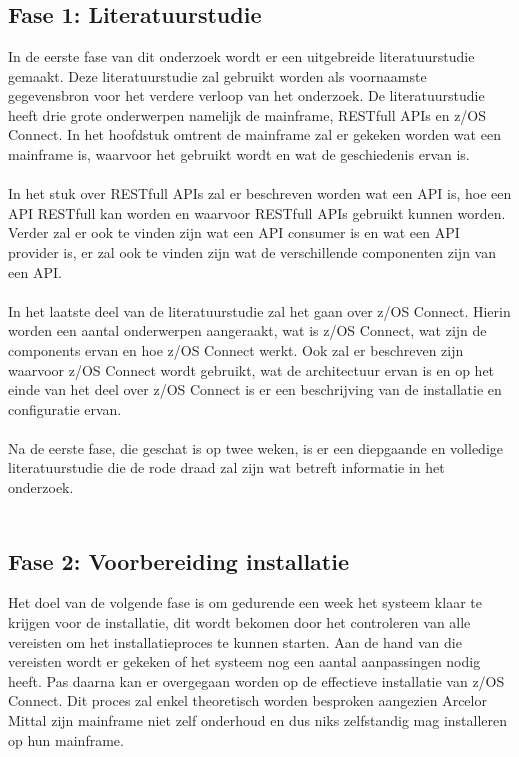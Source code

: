 
\chapter{}%
\label{ch:methodologie}
\section{Fase 1: Literatuurstudie}
\label{sec:Fase 1: Literatuurstudie}
In de eerste fase van dit onderzoek wordt er een uitgebreide literatuurstudie gemaakt. Deze literatuurstudie zal gebruikt worden als voornaamste gegevensbron voor het verdere verloop van het onderzoek. De literatuurstudie heeft drie grote onderwerpen namelijk de mainframe, RESTfull APIs en z/OS Connect. In het hoofdstuk omtrent de mainframe zal er gekeken worden wat een mainframe is, waarvoor het gebruikt wordt en wat de geschiedenis ervan is.
\\ \\
In het stuk over RESTfull APIs zal er beschreven worden wat een API is, hoe een API RESTfull kan worden en waarvoor RESTfull APIs gebruikt kunnen worden. Verder zal er ook te vinden zijn wat een API consumer is en wat een API provider is, er zal ook te vinden zijn wat de verschillende componenten zijn van een API.
\\ \\
In het laatste deel van de literatuurstudie zal het gaan over z/OS Connect. Hierin worden een aantal onderwerpen aangeraakt, wat is z/OS Connect, wat zijn de components ervan en hoe z/OS Connect werkt. Ook zal er beschreven zijn waarvoor z/OS Connect wordt gebruikt, wat de architectuur ervan is en op het einde van het deel over z/OS Connect is er een beschrijving van de installatie en configuratie ervan.
\\ \\
Na de eerste fase, die geschat is op twee weken, is er een diepgaande en volledige literatuurstudie die de rode draad zal zijn wat betreft informatie in het onderzoek.
\\ \\
\section{Fase 2: Voorbereiding installatie}
\label{sec:Fase 2: Voorbereiding installatie}
Het doel van de volgende fase is om gedurende een week het systeem klaar te krijgen voor de installatie, dit wordt bekomen door het controleren van alle vereisten om het installatieproces te kunnen starten. Aan de hand van die vereisten wordt er gekeken of het systeem nog een aantal aanpassingen nodig heeft. Pas daarna kan er overgegaan worden op de effectieve installatie van z/OS Connect. Dit proces zal enkel theoretisch worden besproken aangezien Arcelor Mittal zijn mainframe niet zelf onderhoud en dus niks zelfstandig mag installeren op hun mainframe.
\\ \\
